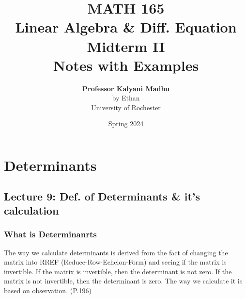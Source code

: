 \documentclass[oneside]{book}
\def\notetitle{MATH 165\\Linear Algebra \& Diff. Equation\\Midterm II \\Notes with Examples}
\def\noteauthor{
    \textbf{Professor Kalyani Madhu} \\ 
    by Ethan\\
    University of Rochester}
\def\notedate{Spring 2024}
\begin{document}
\title{\textbf{
    \LARGE{\notetitle} \vspace*{10\baselineskip}}
    }
\author{\noteauthor}
\date{\notedate}

\maketitle
\newpage

\tableofcontents
\newpage








\chapter{Determinants}
\section{Lecture 9: Def. of Determinants \& it's calculation}


\subsection{What is Determinanrts}

The way we calculate determinants is derived from the fact of changing the matrix into RREF (Reduce-Row-Echelon-Form) and seeing if the matrix is invertible. If the matrix is invertible, then the determinant is not zero. If the matrix is not invertible, then the determinant is zero. The way we calculate it is based on observation. (P.196)
\end{document}
